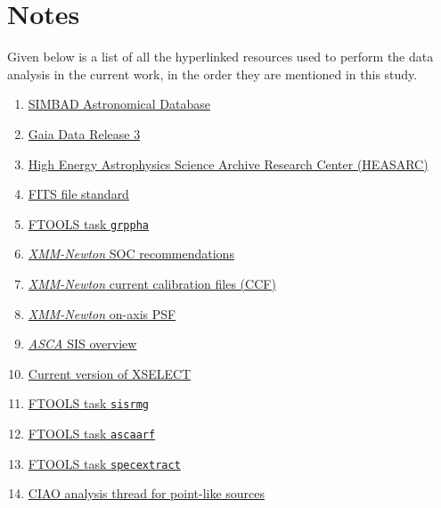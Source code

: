 \section*{Notes}
	Given below is a list of all the hyperlinked resources used to perform the data analysis in the current work, in the order they are mentioned in this study.
	\begin{enumerate}[1]%
		\setlength{\itemsep}{0pt}
		\item \href{http://simbad.u-strasbg.fr/simbad/}{SIMBAD Astronomical Database}
		\item \href{https://www.cosmos.esa.int/web/gaia/data-release-3}{Gaia Data Release 3}
		\item \href{https://heasarc.gsfc.nasa.gov/db-perl/W3Browse/w3browse.pl}{High Energy Astrophysics Science Archive Research Center (HEASARC)}
		\item \href{https://fits.gsfc.nasa.gov/standard40/fits_standard40aa-le.pdf}{FITS file standard}
		\item \href{https://heasarc.gsfc.nasa.gov/docs/heasarc/caldb/docs/memos/cal_sw_93_010/cal_sw_93_010.pdf}{FTOOLS task \texttt{grppha}}
		\item \href{https://xmmweb.esac.esa.int/docs/documents/CAL-TN-0018.pdf}{\textit{XMM-Newton} SOC recommendations}
		\item \href{https://www.cosmos.esa.int/web/xmm-newton/current-calibration-files}{\textit{XMM-Newton} current calibration files (CCF)}
		\item \href{https://xmm-tools.cosmos.esa.int/external/xmm_user_support/documentation/uhb/onaxisxraypsf.html}{\textit{XMM-Newton} on-axis PSF}
		\item \href{https://heasarc.gsfc.nasa.gov/docs/asca/newsletters/sis_overview.html}{\textit{ASCA} SIS overview}
		\item \href{https://heasarc.gsfc.nasa.gov/ftools/xselect/}{Current version of XSELECT}
		\item \href{https://heasarc.gsfc.nasa.gov/lheasoft/ftools/fhelp/sisrmg.html}{FTOOLS task \texttt{sisrmg}}
		\item \href{https://heasarc.gsfc.nasa.gov/lheasoft/ftools/fhelp/ascaarf.html}{FTOOLS task \texttt{ascaarf}}
		\item \href{https://cxc.cfa.harvard.edu/ciao/ahelp/specextract.html}{FTOOLS task \texttt{specextract}}
		\item \href{https://cxc.cfa.harvard.edu/ciao/threads/pointlike/}{CIAO analysis thread for point-like sources}

\end{enumerate}
